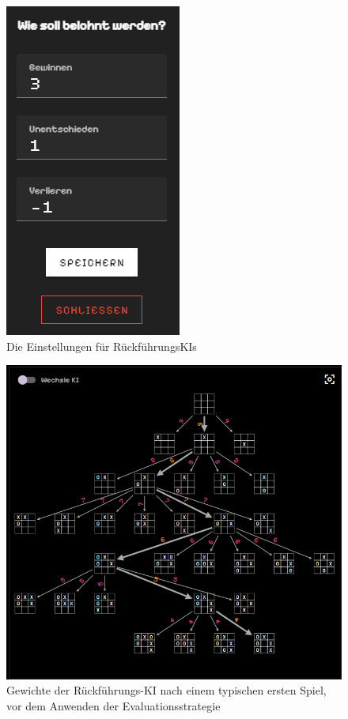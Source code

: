\documentclass[titlepage]{scrartcl}
\begin{document}
\begin{figure}[htb]
\includegraphics{rückführungEinstellungen.png}
\caption{Die Einstellungen für RückführungsKIs}
\label{rückführungEinstellungen}
\end{figure}

\begin{figure}[htb]
\includegraphics[width = \linewidth]{rückführungPrä.png}
\caption{Gewichte der Rückführungs-KI nach einem typischen ersten Spiel, vor dem Anwenden der Evaluationsstrategie}
\label{rückführungPrä}
\end{figure}
\end{document}
